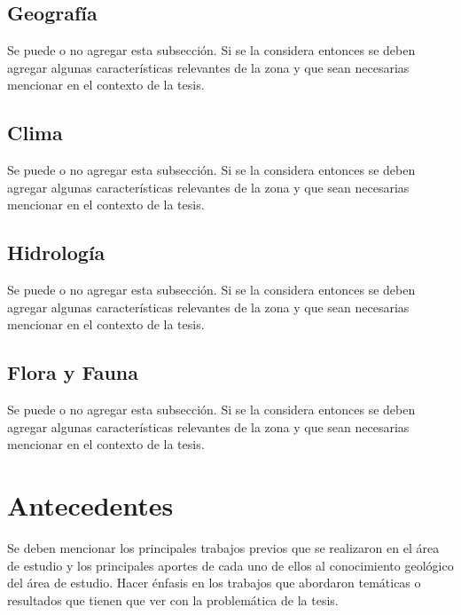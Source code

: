             \subsection{Geografía}
             Se puede o no agregar esta subsección. Si se la considera entonces se deben agregar algunas características relevantes de la zona y que sean necesarias mencionar en el contexto de la tesis. 
            \subsection{Clima}
             Se puede o no agregar esta subsección. Si se la considera entonces se deben agregar algunas características relevantes de la zona y que sean necesarias mencionar en el contexto de la tesis. 
            \subsection{Hidrología}
            Se puede o no agregar esta subsección. Si se la considera entonces se deben agregar algunas características relevantes de la zona y que sean necesarias mencionar en el contexto de la tesis. 
            \subsection{Flora y Fauna}
            Se puede o no agregar esta subsección. Si se la considera entonces se deben agregar algunas características relevantes de la zona y que sean necesarias mencionar en el contexto de la tesis. 
\section{Antecedentes}
            Se deben mencionar los principales trabajos previos que se realizaron en el área de estudio y los principales aportes de cada uno de ellos al conocimiento geológico del área de estudio. Hacer énfasis en los trabajos que abordaron temáticas o resultados que tienen que ver con la problemática de la tesis.

